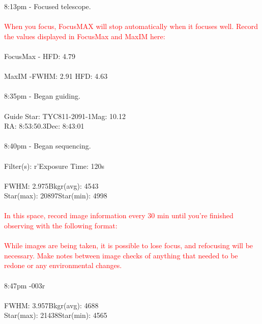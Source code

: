 \documentclass[11pt]{report}
\begin{document}
8:13pm - Focused telescope. \\ \\
\textcolor{red}{When you focus, FocusMAX will stop automatically when it focuses well. Record the values displayed in FocusMax and MaxIM here:} \\  \\
FocusMax - \hspace{72pt}HFD: 4.79 \\ \\
MaxIM -\hspace{90pt}FWHM: 2.91 \hspace{75pt}HFD: 4.63 \\ \\
8:35pm - Began guiding. \\ \\
Guide Star: TYC811-2091-1\hspace{20pt}Mag: 10.12 \\
RA: 8:53:50.3\hspace{90pt}Dec: 8:43:01\\ \\
8:40pm - Began sequencing. \\ \\
Filter(s): r'\hspace{83pt}Exposure Time: 120s\\ \\
FWHM: 2.975\hspace{70pt}Bkgr(avg): 4543 \\
Star(max): 20897\hspace{55pt}Star(min): 4998\\ \\
\textcolor{red}{In this space, record image information every 30 min until you're finished observing with the following format:} \\ \\
\textcolor{red}{While images are being taken, it is possible to lose focus, and refocusing will be necessary. Make notes between image checks of anything that needed to be redone or any environmental changes.} \\ \\
8:47pm -\hspace{97pt}003r \\ \\
FWHM: 3.957\hspace{70pt}Bkgr(avg): 4688 \\
Star(max): 21438\hspace{55pt}Star(min): 4565\\ \\
\end{document}
